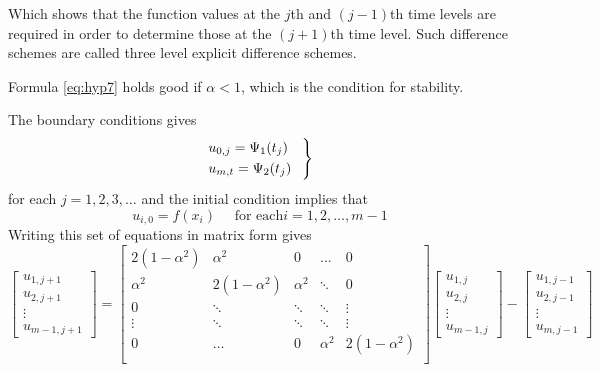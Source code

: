 \documentclass[../main-sheet.tex]{subfiles}
\begin{document}
Which shows that the function values at the \(j\)th and \((j-1)\)th time levels are required in order to determine those at the \((j+1)\)th time level. Such difference schemes are called three level explicit difference schemes.
\begin{note}
    Formula \eqref{eq:hyp7} holds good if \(\alpha<1\), which is the condition for stability.
\end{note}

The boundary conditions gives
\begin{equation}
    \begin{rcases}
        \displaystyle u_{0,j}=\Psi_1(t_j)\quad\\
        \displaystyle u_{m,t}=\Psi_2(t_j)    
    \end{rcases}
    \label{eq:hyp8}
\end{equation}
for each \(j=1,2,3,\dots\) and the initial condition implies that
\begin{equation}
    u_{i,0}=f(x_i)\quad \text{ for each} i=1,2,\dots,m-1
    \label{eq:hyp9}
\end{equation}
Writing this set of equations in matrix form gives
\begin{equation}
    \begin{bmatrix}
        u_{1,j+1}\\u_{2,j+1}\\\vdots\\u_{m-1,j+1}
    \end{bmatrix}=
    \begin{bmatrix}
        2(1-\alpha^2)& \alpha^2 & 0& \dots &0\\
        \alpha^2& 2(1-\alpha^2) & \alpha^2 & \ddots &0\\
        0& \ddots & \ddots & \ddots & \vdots\\
        \vdots& \ddots & \ddots & \ddots & \vdots\\
        0& \dots & 0 & \alpha^2 & 2(1-\alpha^2)\\
    \end{bmatrix}
    \begin{bmatrix}
        u_{1,j}\\u_{2,j}\\\vdots\\u_{m-1,j}
    \end{bmatrix}-
    \begin{bmatrix}
        u_{1,j-1}\\u_{2,j-1}\\\vdots\\u_{m,j-1}
    \end{bmatrix}
    \label{eq:hyp10}
\end{equation}
\end{document}
